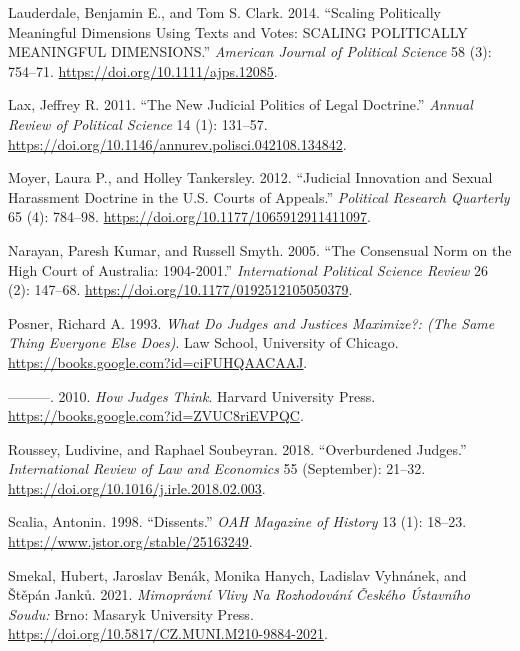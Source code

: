 \documentclass[
  11pt,
]{article}
\newlength{\cslhangindent}
\newenvironment{CSLReferences}[2] %
 {%
  \setlength{\parindent}{0pt}
  \ifodd #1 \everypar{\setlength{\hangindent}{\cslhangindent}}\ignorespaces\fi
  \ifnum #2 > 0
  \setlength{\parskip}{#2\baselineskip}
  \fi
 }%
 {}
\begin{document}
\begin{CSLReferences}{1}{0}
\leavevmode{}%
Lauderdale, Benjamin E., and Tom S. Clark. 2014. {``Scaling {Politically
Meaningful Dimensions Using Texts} and {Votes}: {SCALING POLITICALLY
MEANINGFUL DIMENSIONS}.''} \emph{American Journal of Political Science}
58 (3): 754--71. \url{https://doi.org/10.1111/ajps.12085}.

\leavevmode{}%
Lax, Jeffrey R. 2011. {``The {New Judicial Politics} of {Legal
Doctrine}.''} \emph{Annual Review of Political Science} 14 (1): 131--57.
\url{https://doi.org/10.1146/annurev.polisci.042108.134842}.

\leavevmode{}%
Moyer, Laura P., and Holley Tankersley. 2012. {``Judicial {Innovation}
and {Sexual Harassment Doctrine} in the {U}.{S}. {Courts} of
{Appeals}.''} \emph{Political Research Quarterly} 65 (4): 784--98.
\url{https://doi.org/10.1177/1065912911411097}.

\leavevmode{}%
Narayan, Paresh Kumar, and Russell Smyth. 2005. {``The {Consensual Norm}
on the {High Court} of {Australia}: 1904-2001.''} \emph{International
Political Science Review} 26 (2): 147--68.
\url{https://doi.org/10.1177/0192512105050379}.

\leavevmode{}%
Posner, Richard A. 1993. \emph{What {Do Judges} and {Justices
Maximize}?: (The {Same Thing Everyone Else Does})}. {Law School,
University of Chicago}. \url{https://books.google.com?id=ciFUHQAACAAJ}.

\leavevmode{}%
---------. 2010. \emph{How {Judges Think}}. {Harvard University Press}.
\url{https://books.google.com?id=ZVUC8riEVPQC}.

\leavevmode{}%
Roussey, Ludivine, and Raphael Soubeyran. 2018. {``Overburdened
Judges.''} \emph{International Review of Law and Economics} 55
(September): 21--32. \url{https://doi.org/10.1016/j.irle.2018.02.003}.

\leavevmode{}%
Scalia, Antonin. 1998. {``Dissents.''} \emph{OAH Magazine of History} 13
(1): 18--23. \url{https://www.jstor.org/stable/25163249}.

\leavevmode{}%
Smekal, Hubert, Jaroslav Benák, Monika Hanych, Ladislav Vyhnánek, and
Štěpán Janků. 2021. \emph{Mimoprávní Vlivy Na Rozhodování Českého
{Ústavního} Soudu:} {Brno}: {Masaryk University Press}.
\url{https://doi.org/10.5817/CZ.MUNI.M210-9884-2021}.


\end{CSLReferences}
\end{document}
